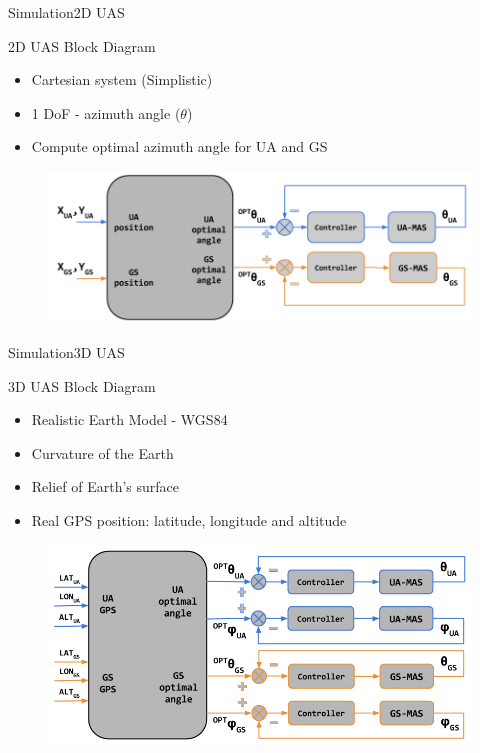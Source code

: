 \begin{frame}{Simulation}{2D UAS}
	\begin{block}{2D UAS Block Diagram}
		\begin{itemize}
		  	\item Cartesian system (Simplistic)
		  	\item 1 DoF - azimuth angle ($\theta$)
		  	\item Compute optimal azimuth angle for UA and GS 
		\end{itemize}

		\begin{figure}
	        \includegraphics[scale=0.32]{figures/2D_system.png}
	    \end{figure}
    \end{block}
\end{frame}

\begin{frame}{Simulation}{3D UAS}
  \begin{block}{3D UAS Block Diagram}
	\begin{itemize}
	  	\item Realistic Earth Model - WGS84
	  	\item Curvature of the Earth
	  	\item Relief of Earth's surface 
	  	\item Real GPS position: latitude, longitude and altitude
	\end{itemize}

	\begin{figure}
		\includegraphics[scale=0.33]{figures/3D_system.png}
	\end{figure}
  \end{block}
\end{frame}

